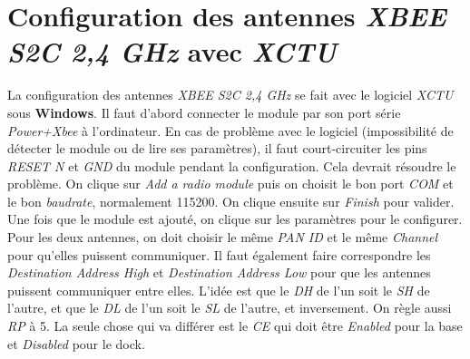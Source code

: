 \documentclass[12pt]{report}
\begin{document}
\section{Configuration des antennes \textit{XBEE S2C 2,4 GHz} avec \textit{XCTU}}
La configuration des antennes \textit{XBEE S2C 2,4 GHz} se fait avec le logiciel \textit{XCTU} sous \textbf{Windows}.
Il faut d'abord connecter le module par son port série \textit{Power+Xbee} à l'ordinateur.
En cas de problème avec le logiciel (impossibilité de détecter le module ou de lire ses paramètres), il faut court-circuiter les pins \textit{RESET N} et \textit{GND} du module pendant la configuration. Cela devrait résoudre le problème.
On clique sur \textit{Add a radio module} puis on choisit le bon port \textit{COM} et le bon \textit{baudrate}, normalement 115200. On clique ensuite sur \textit{Finish} pour valider.
Une fois que le module est ajouté, on clique sur les paramètres pour le configurer. 
Pour les deux antennes, on doit choisir le même \textit{PAN ID} et le même \textit{Channel} pour qu'elles puissent communiquer.
Il faut également faire correspondre les \textit{Destination Address High} et \textit{Destination Address Low} pour que les antennes puissent communiquer entre elles. L'idée est que le \textit{DH} de l'un soit le \textit{SH} de l'autre, et que le \textit{DL} de l'un soit le \textit{SL} de l'autre, et inversement.
On règle aussi \textit{RP} à 5. La seule chose qui va différer est le \textit{CE} qui doit être \textit{Enabled} pour la base et \textit{Disabled} pour le dock.




\end{document}

